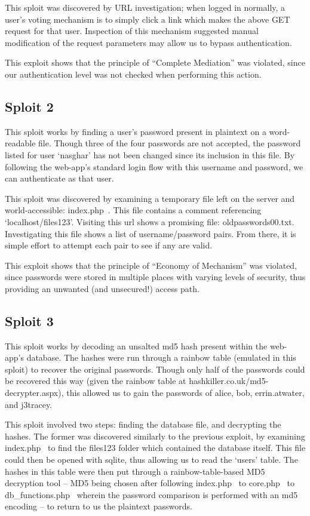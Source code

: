 \documentclass[12pt]{article}
\begin{document}
This sploit was discovered by URL investigation; when logged in normally, a user's voting mechanism is to simply click a link which makes the above GET request for that user. Inspection of this mechanism suggested manual modification of the request parameters may allow us to bypass authentication.

This exploit shows that the principle of ``Complete Mediation'' was violated, since our authentication level was not checked when performing this action.

\subsection*{Sploit 2}
This sploit works by finding a user's password present in plaintext on a word-readable file. Though three of the four passwords are not accepted, the password listed for user `nasghar' has not been changed since its inclusion in this file. By following the web-app's standard login flow with this username and password, we can authenticate as that user.

This sploit was discovered by examining a temporary file left on the server and world-accessible: index.php~. This file contains a comment referencing `localhost/files123'. Visiting this url shows a promising file: oldpasswords00.txt. Investigating this file shows a list of username/password pairs. From there, it is simple effort to attempt each pair to see if any are valid.

This exploit shows that the principle of ``Economy of Mechanism'' was violated, since passwords were stored in multiple places with varying levels of security, thus providing an unwanted (and unsecured!) access path.

\subsection*{Sploit 3}
This sploit works by decoding an unsalted md5 hash present within the web-app's database. The hashes were run through a rainbow table (emulated in this sploit) to recover the original passwords. Though only half of the passwords could be recovered this way (given the rainbow table at hashkiller.co.uk/md5-decrypter.aspx), this allowed us to gain the passwords of alice, bob, errin.atwater, and j3tracey.

This sploit involved two steps: finding the database file, and decrypting the hashes. The former was discovered similarly to the previous exploit, by examining index.php~ to find the files123 folder which contained the database itself. This file could then be opened with sqlite, thus allowing us to read the `users' table. The hashes in this table were then put through a rainbow-table-based MD5 decryption tool -- MD5 being chosen after following index.php~ to core.php~ to db\_functions.php~ wherein the password comparison is performed with an md5 encoding -- to return to us the plaintext passwords.
\end{document}
